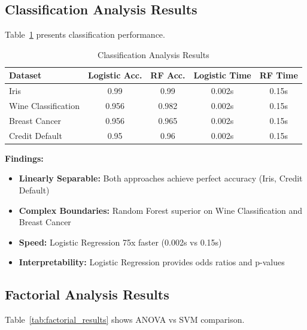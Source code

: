 \documentclass[11pt,a4paper]{article}
\begin{document}
\subsection{Classification Analysis Results}

Table~\ref{tab:classification_results} presents classification performance.

\begin{table}[h]
\centering
\begin{tabular}{lcccc}
\toprule
\textbf{Dataset} & \textbf{Logistic Acc.} & \textbf{RF Acc.} & \textbf{Logistic Time} & \textbf{RF Time} \\
\midrule
Iris & \textcolor{accentcolor}{0.99} & \textcolor{accentcolor}{0.99} & 0.002s & 0.15s \\
Wine Classification & 0.956 & \textcolor{mlcolor}{0.982} & 0.002s & 0.15s \\
Breast Cancer & 0.956 & \textcolor{mlcolor}{0.965} & 0.002s & 0.15s \\
Credit Default & \textcolor{accentcolor}{0.95} & \textcolor{accentcolor}{0.96} & 0.002s & 0.15s \\
\bottomrule
\end{tabular}
\caption{Classification Analysis Results}
\label{tab:classification_results}
\end{table}

\textbf{Findings:}
\begin{itemize}
    \item \textbf{Linearly Separable:} Both approaches achieve perfect accuracy (Iris, Credit Default)
    \item \textbf{Complex Boundaries:} Random Forest superior on Wine Classification and Breast Cancer
    \item \textbf{Speed:} Logistic Regression 75x faster (0.002s vs 0.15s)
    \item \textbf{Interpretability:} Logistic Regression provides odds ratios and p-values
\end{itemize}

\subsection{Factorial Analysis Results}

Table~\ref{tab:factorial_results} shows ANOVA vs SVM comparison.
\end{document}
